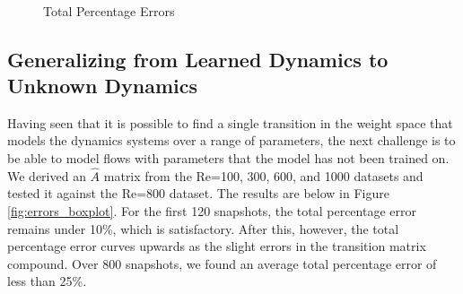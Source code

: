 \documentclass[letterpaper,12pt,peerreviewca,draftcls]{IEEEtran}
\newcommand{\dualop}{A}
\newcommand{\dualopApprox}{\widehat{\dualop}}
\begin{document}
\begin{figure}[h] %
	\centering
	\\
	\caption{Total Percentage Errors}
\end{figure}

\subsection{Generalizing from Learned Dynamics to Unknown Dynamics}\label{sec:generalize}

Having seen that it is possible to find a single transition in the weight space that models the dynamics systems over a range of parameters, the next challenge is to be able to model flows with parameters that the model has not been trained on. We derived an $\dualopApprox$ matrix from the Re=100, 300, 600, and 1000 datasets and tested it against the Re=800 dataset. The results are below in Figure \ref{fig:errors_boxplot}. For the first 120 snapshots, the total percentage error remains under 10\%, which is satisfactory. After this, however, the total percentage error curves upwards as the slight errors in the transition matrix compound. Over 800 snapshots, we found an average total percentage error of less than 25\%. 
\end{document}
